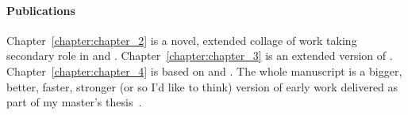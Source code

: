 {\paragraph{Publications}
Chapter~\ref{chapter:chapter_2} is a novel, extended collage of work taking secondary role in \citet{kogkalidis-etal-2020-aethel} and \citet{rouss}.
Chapter~\ref{chapter:chapter_3} is an extended version of \citet{kogkalidis-etal-2020-aethel}.
Chapter~\ref{chapter:chapter_4} is based on \citet{kogkalidis-etal-2019-constructive,kogkalidis-etal-2020-neural} and \citet[preprint]{kogkalidis2022geometryaware}.
The whole manuscript is a bigger, better, faster, stronger (or so I'd like to think) version of early work delivered as part of my master's thesis~\cite{https://doi.org/10.48550/arxiv.1909.02955}.



\relax
}